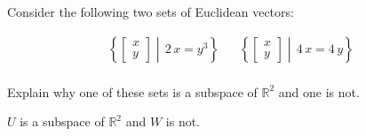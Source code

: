 
\begin{exerciseStatement}


Consider the following two sets of Euclidean vectors: 


\begin{align*}  \left\{ \left[\begin{array}{c}
x \\
y
\end{array}\right] \middle|\,2 \, x = y^{3}\right\}  & &   \left\{ \left[\begin{array}{c}
x \\
y
\end{array}\right] \middle|\,4 \, x = 4 \, y\right\}  \\ \end{align*}
            

 Explain why one of these sets is a subspace of \(\mathbb{R}^ 2 \) and one is not. 


\end{exerciseStatement}
    
\begin{exerciseAnswer} 


\(U\) is a subspace of \(\mathbb{R}^ 2 \) and \(W\) is not.


\end{exerciseAnswer}
    
